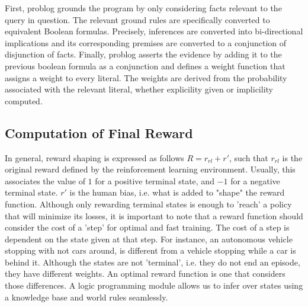 First, problog grounds the program by only considering facts relevant to the query in question. 
The relevant ground rules are specifically converted to equivalent Boolean formulas. 
Precisely, inferences are converted into bi-directional implications and its corresponding premises 
are converted to a conjunction of disjunction of facts. 
Finally, problog asserts the evidence by adding it to the previous boolean formula 
as a conjunction and defines a weight function that assigns a weight to every literal. 
The weights are derived from the probability associated with the relevant literal, whether explicility 
given or implicility computed. 

\subsection{Computation of Final Reward}
In general, reward shaping is expressed as follows
  $R = r_{rl} + r'$, 
such that $r_{rl}$ is the original reward defined by the reinforcement learning environment. Usually, this associates the value of $1$ for a positive terminal state, 
and $-1$ for a negative terminal state. $r'$ is the human bias, i.e. what is added to "shape" the reward function. 
Although only rewarding terminal states is enough to 'reach' a policy that will minimize its losses, it is important to note that a reward function should consider the cost of a 'step' 
for optimal and fast training. The cost of a step is dependent on the state given at that step. For instance, an autonomous vehicle stopping with not cars around, is different from a vehicle 
stopping while a car is behind it. Although the states are not 'terminal', i.e. they do not end an episode, they have different weights. 
An optimal reward function is one that considers those differences. A logic programming module allows us to infer over states using a knowledge base and world rules seamlessly. 

